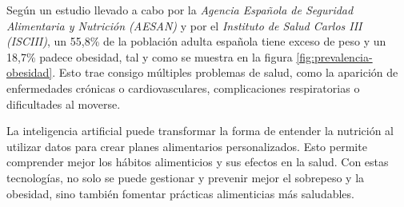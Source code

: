 Según un estudio llevado a cabo por la \textit{Agencia Española de Seguridad Alimentaria y Nutrición (AESAN)} y por el \textit{Instituto de Salud Carlos III (ISCIII)}, un 55,8\% de la población adulta española tiene exceso de peso y un 18,7\% padece obesidad, tal y como se muestra en la figura \ref{fig:prevalencia-obesidad}. Esto trae consigo múltiples problemas de salud, como la aparición de enfermedades crónicas o cardiovasculares, complicaciones respiratorias o dificultades al moverse.

La inteligencia artificial puede transformar la forma de entender la nutrición al utilizar datos para crear planes alimentarios personalizados. Esto permite comprender mejor los hábitos alimenticios y sus efectos en la salud. Con estas tecnologías, no solo se puede gestionar y prevenir mejor el sobrepeso y la obesidad, sino también fomentar prácticas alimenticias más saludables.

